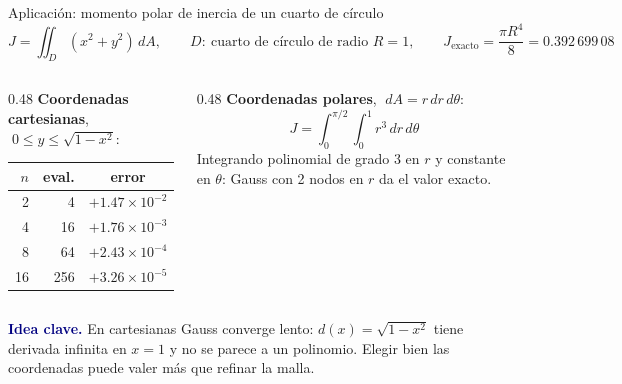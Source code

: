 \documentclass[aspectratio=169,10pt]{beamer}
\newcommand{\ideaclave}[1]{\begin{clave}\small\textbf{\textcolor{navy}{Idea clave.}} #1\end{clave}}
\begin{document}
\begin{frame}{Aplicaci\'on: momento polar de inercia de un cuarto de c\'irculo}
\small
\[
J=\iint_D(x^2+y^2)\,dA,\qquad D:\ \text{cuarto de c\'irculo de radio }R=1,\qquad J_{\text{exacto}}=\frac{\pi R^4}{8}=0.392\,699\,08
\]
\begin{columns}[T]
\begin{column}{0.48\textwidth}
\textbf{Coordenadas cartesianas}, $\;0\le y\le\sqrt{1-x^2}$:\\[3pt]
\centering
\begin{tabular}{@{}rrc@{}}
\toprule
$n$ & eval. & error\\
\midrule
2 & 4 & $+1.47\times10^{-2}$\\
4 & 16 & $+1.76\times10^{-3}$\\
8 & 64 & $+2.43\times10^{-4}$\\
16 & 256 & $+3.26\times10^{-5}$\\
\bottomrule
\end{tabular}
\end{column}
\begin{column}{0.48\textwidth}
\textbf{Coordenadas polares}, $\;dA=r\,dr\,d\theta$:
\[
J=\int_0^{\pi/2}\!\!\int_0^1 r^3\,dr\,d\theta
\]
Integrando polinomial de grado 3 en $r$ y constante en $\theta$: Gauss con \alert{2 nodos en $r$} da el valor \alert{exacto}.
\end{column}
\end{columns}
\ideaclave{En cartesianas Gauss converge lento: $d(x)=\sqrt{1-x^2}$ tiene derivada infinita en $x=1$ y no se parece a un polinomio. \alert{Elegir bien las coordenadas} puede valer m\'as que refinar la malla.}
\end{frame}

\end{document}
